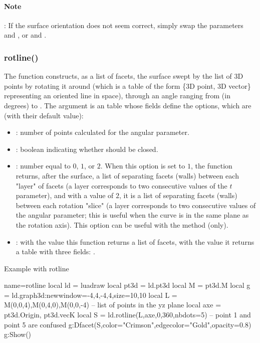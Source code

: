 \paragraph{Note}: If the surface orientation does not seem correct, simply swap the parameters  and , or  and .

\subsubsection{rotline()}

The function  constructs, as a list of facets, the surface swept by the list of 3D points  by rotating it around  (which is a table of the form \{3D point, 3D vector\} representing an oriented line in space), through an angle ranging from  (in degrees) to . The argument  is an table whose fields define the options, which are (with their default value):
\begin{itemize}
    \item {}: number of points calculated for the angular parameter.

    \item {}: boolean indicating whether  should be closed.

    \item {}: number equal to $0$, $1$, or $2$. When this option is set to $1$, the function returns, after the surface, a list of separating facets (walls) between each "layer" of facets (a layer corresponds to two consecutive values ​​of the $t$ parameter), and with a value of $2$, it is a list of separating facets (walls) between each rotation "slice" (a layer corresponds to two consecutive values ​​of the angular parameter; this is useful when the curve is in the same plane as the rotation axis). This option can be useful with the  method (only).
    
   \item {} : with the value \false this function returns a list of facets, with the value \true it returns a table with three fields: .     
\end{itemize}

\begin{demo}{Example with rotline}
\begin{luadraw}{name=rotline}
local ld = luadraw
local pt3d = ld.pt3d
local M = pt3d.M
local g = ld.graph3d:new{window={-4,4,-4,4},size={10,10}}
local L = {M(0,0,4),M(0,4,0),M(0,0,-4)} -- list of points in the yz plane
local axe = {pt3d.Origin, pt3d.vecK}
local S = ld.rotline(L,axe,0,360,{nbdots=5}) -- point 1 and point 5 are confused
g:Dfacet(S,{color="Crimson",edgecolor="Gold",opacity=0.8})
g:Show()
\end{luadraw}
\end{demo}      


